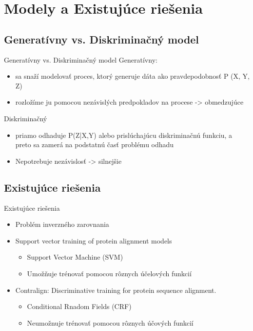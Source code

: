 \documentclass[xcolor=dvipsnames, compress, 12pt]{beamer}
\begin{document}
\section{Modely a Existujúce riešenia}
\subsection{Generatívny vs. Diskriminačný model}
\begin{frame}{Generatívny vs. Diskriminačný model}
Generatívny:
\begin{itemize}
\item sa snaží modelovať proces, ktorý generuje dáta ako pravdepodobnosť P (X, Y, Z)
\item rozložíme ju pomocou nezávislých predpokladov na procese -> obmedzujúce
\end{itemize} 
\pause
Diskriminačný
\begin{itemize}
\item priamo odhaduje P(Z|X,Y) alebo prislúchajúcu diskriminačnú funkciu, a preto sa zamerá na podstatnú časť problému odhadu
\item Nepotrebuje nezávislosť -> silnejšie
\end{itemize}   
\end{frame}


\subsection{Existujúce riešenia}
\begin{frame}{Existujúce riešenia}
  \begin{itemize}
    \item Problém inverzného zarovnania
    \pause
    \item Support vector training of protein alignment models
    \begin{itemize}
      \item Support Vector Machine (SVM)
      \item Umožňuje trénovať pomocou rôznych účelových funkcií
    \end{itemize}
    \pause
    \item Contralign: Discriminative training for protein sequence alignment.
    \begin{itemize}
      \item Conditional Rnadom Fields (CRF)
      \item Neumožnuje trénovať pomocou rôznych účových funkcií    
    \end{itemize}
  \end{itemize} 
\end{frame}
\end{document}
